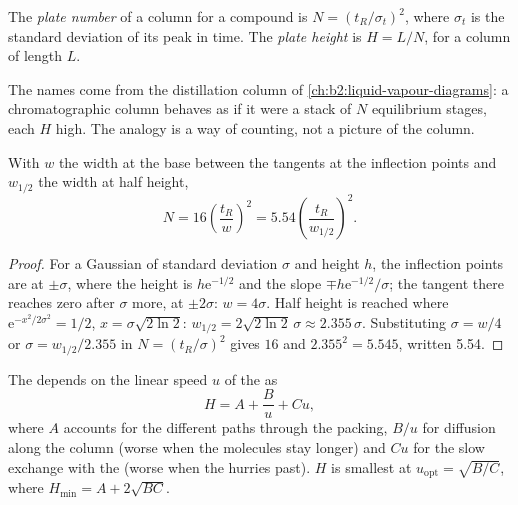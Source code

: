 \begin{definition}\label{def:b2:chromatography:plates}
The \emph{plate number} of a column for a compound is $N = (t_R/\sigma_t)^2$, where
$\sigma_t$ is the standard deviation of its peak in time. The \emph{plate height} is
$H = L/N$, for a column of length $L$.
\end{definition}

The names come from the distillation column of \cref{ch:b2:liquid-vapour-diagrams}: a chromatographic
column behaves as if it were a stack of $N$ equilibrium stages, each $H$ high. The analogy is a way of
counting, not a picture of the column.

\begin{proposition}\label{prop:b2:chromatography:plate-number}
With $w$ the width at the base between the tangents at the inflection points and $w_{1/2}$ the width at
half height,
\begin{equation*}
N = 16\left(\frac{t_R}{w}\right)^2 = 5.54\left(\frac{t_R}{w_{1/2}}\right)^2.
\end{equation*}
\end{proposition}

\begin{proof}
For a Gaussian of standard deviation $\sigma$ and height $h$, the inflection points are at $\pm\sigma$,
where the height is $h\mathrm e^{-1/2}$ and the slope $\mp h\mathrm e^{-1/2}/\sigma$; the tangent there
reaches zero after $\sigma$ more, at $\pm2\sigma$: $w = 4\sigma$. Half height is reached where
$\mathrm e^{-x^2/2\sigma^2} = 1/2$, $x = \sigma\sqrt{2\ln2}$: $w_{1/2} = 2\sqrt{2\ln2}\,\sigma \approx
2.355\,\sigma$. Substituting $\sigma = w/4$ or $\sigma = w_{1/2}/2.355$ in $N = (t_R/\sigma)^2$ gives
$16$ and $2.355^2 = 5.545$, written 5.54.
\end{proof}

\begin{proposition}\label{prop:b2:chromatography:van-deemter}
The  depends on the linear speed $u$ of the  as
\begin{equation*}
H = A + \frac{B}{u} + Cu,
\end{equation*}
where $A$ accounts for the different paths through the packing, $B/u$ for diffusion along the column
(worse when the molecules stay longer) and $Cu$ for the slow exchange with the  (worse
when the  hurries past). $H$ is smallest at $u_{\mathrm{opt}} = \sqrt{B/C}$, where $H_{\min} =
A + 2\sqrt{BC}$.
\end{proposition}


